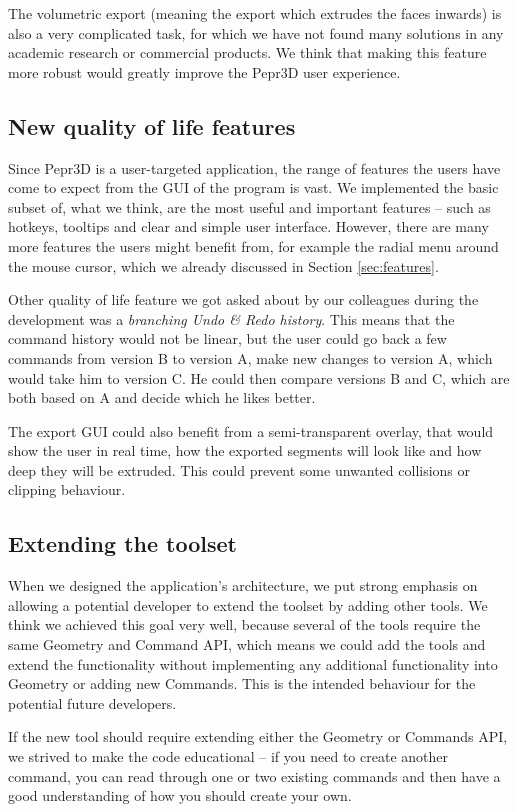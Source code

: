 The volumetric export (meaning the export which extrudes the faces inwards) is also a very complicated task, for which we have not found many solutions in any academic research or commercial products. We think that making this feature more robust would greatly improve the Pepr3D user experience.

\subsection{New quality of life features}

Since Pepr3D is a user-targeted application, the range of features the users have come to expect from the GUI of the program is vast. We implemented the basic subset of, what we think, are the most useful and important features -- such as hotkeys, tooltips and clear and simple user interface. However, there are many more features the users might benefit from, for example the radial menu around the mouse cursor, which we already discussed in Section \ref{sec:features}.

Other quality of life feature we got asked about by our colleagues during the development was a \textit{branching Undo \& Redo history}. This means that the command history would not be linear, but the user could go back a few commands from version B to version A, make new changes to version A, which would take him to version C. He could then compare versions B and C, which are both based on A and decide which he likes better.

The export GUI could also benefit from a semi-transparent overlay, that would show the user in real time, how the exported segments will look like and how deep they will be extruded. This could prevent some unwanted collisions or clipping behaviour.

\subsection{Extending the toolset}

When we designed the application's architecture, we put strong emphasis on allowing a potential developer to extend the toolset by adding other tools. We think we achieved this goal very well, because several of the tools require the same Geometry and Command API, which means we could add the tools and extend the functionality without implementing any additional functionality into Geometry or adding new Commands. This is the intended behaviour for the potential future developers.

If the new tool should require extending either the Geometry or Commands API, we strived to make the code educational -- if you need to create another command, you can read through one or two existing commands and then have a good understanding of how you should create your own.
